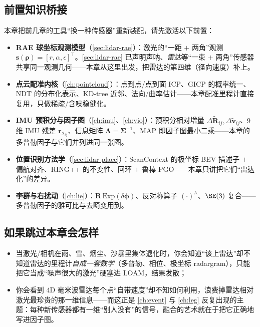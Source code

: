 \subsection*{前置知识桥接}
本章把前几章的工具“换一种传感器”重新装配，请先激活以下前置：
\begin{itemize}
  \item \textbf{RAE 球坐标观测模型}（\cref{sec:lidar-rae}）：激光的“一距 $+$ 两角”观测 $\mathbf s(\boldsymbol\rho)=[r,\alpha,\epsilon]^\top$。\cref{sec:lidar-rae} 已声明声呐、\emph{雷达}等“一束 $+$ 两角”传感器共享同一观测几何——本章从这里出发，把雷达的第四维（径向速度）补上。
  \item \textbf{点云配准内核}（\cref{ch:pointcloud}）：点到点/点到面 ICP、GICP 的概率统一、NDT 的分布化表示、KD-tree 近邻、法向/曲率估计——本章配准里程计直接复用，只做稀疏/含噪稳健化。
  \item \textbf{IMU 预积分与因子图}（\cref{ch:imu}、\cref{ch:vio}）：预积分相对增量 $\Delta\tilde{\mathbf R}_{ij},\Delta\tilde{\mathbf v}_{ij}$、$9$ 维 IMU 残差 $\mathbf r_{\mathcal I_{ij}}$、信息矩阵 $\boldsymbol\Lambda=\boldsymbol\Sigma^{-1}$、MAP 即因子图最小二乘——本章的多普勒因子与它们并列进同一张图。
  \item \textbf{位置识别方法学}（\cref{sec:lidar-place}）：ScanContext 的极坐标 BEV 描述子 $+$ 偏航对齐、RING++ 的不变性、回环 $+$ 鲁棒 PGO——本章只讲把它们“雷达化”的差异。
  \item \textbf{李群与右扰动}（\cref{ch:lie}）：$\mathbf R\,\mathrm{Exp}(\delta\boldsymbol\phi)$、反对称算子 $(\cdot)^\wedge$、$\SE(3)$ 复合——多普勒因子的雅可比与去畸变用到。
\end{itemize}

\subsection*{如果跳过本章会怎样}
\begin{itemize}
  \item 当激光/相机在雨、雪、烟尘、沙暴里集体退化时，你会知道“该上雷达”却不知道雷达的里程计\emph{自成一套数学}（多普勒、相位、极坐标 radargram），只能把它当成“噪声很大的激光”硬塞进 LOAM，结果发散；
  \item 你会看到 $4$D 毫米波雷达每个点“自带速度”却不知如何利用，浪费掉雷达相对激光最珍贵的那一维信息——而这正是 \cref{ch:event} 与 \cref{ch:leg} 反复出现的主题：每种新传感器都有一维“别人没有”的信号，融合的艺术就在于把它正确地写进因子图。
\end{itemize}

